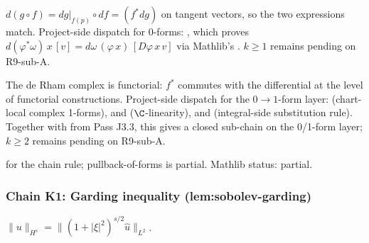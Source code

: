\begin{lemma}
\label{lem:bfp-r3}
$d(g\circ f) = dg|_{f(p)}\circ df = (f^{*}dg)$ on tangent vectors, so
the two expressions match.  Project-side dispatch for 0-forms:
,
which proves
$d(\varphi^{*}\omega)\,x\,[v] = d\omega\,(\varphi\,x)\,[D\varphi\,x\,v]$
via Mathlib's .  $k\geq 1$ remains pending on
R9-sub-A.
\leanok
\end{lemma}

\begin{lemma}
\label{lem:bfp-r4}
The de Rham complex is functorial: $f^{*}$ commutes with the
differential at the level of functorial constructions.  Project-side
dispatch for the $0\to 1$-form layer:
(chart-local complex 1-forms),
and  ($\C$-linearity), and
(integral-side substitution rule).  Together with
 from Pass J3.3, this
gives a closed sub-chain on the 0/1-form layer; $k\geq 2$ remains
pending on R9-sub-A.
\leanok
\end{lemma}

\begin{lemma}
\label{lem:bfp-r5}
 for the chain rule; pullback-of-forms is partial.  Mathlib status: partial.
\leanok
\end{lemma}

\subsubsection*{Chain K1: Garding inequality (lem:sobolev-garding)}

\begin{lemma}
\label{lem:sgd-r1}
$\|u\|_{H^{s}} = \|(1+|\xi|^{2})^{s/2}\hat u\|_{L^{2}}$.
\leanok
\end{lemma}

